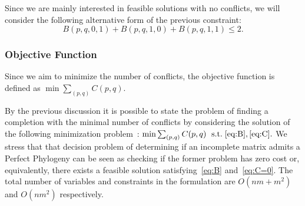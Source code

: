 \documentclass[a4paper,USenglish]{article}
\newcommand{\notaestesa}[2]{%
   \marginpar{\color{red!75!black}\textbf{\texttimes}}%
   {\color{red!75!black}%
     [\,\textbullet\,\textsf{\textbf{#1:}} %
     \textsf{\footnotesize#2}\,\textbullet\,]}%
 }
\theoremstyle{definition}
\begin{document}
Since we are mainly interested in feasible solutions with no conflicts,
we  will  consider  the   following  alternative  form  of  the  previous
constraint: 
\begin{equation}\label{eq:C=0}
   B(p,q,0,1) + B(p,q,1,0) + B(p,q,1,1)\le 2.  
\end{equation}


%
\subsubsection{Objective Function} Since we aim to minimize
the number of conflicts,  the objective function is defined as
$\min\sum_{(p,q)}C(p,q)$.

By the previous discussion it is possible to state the problem of
finding a  completion with the  minimal number  of conflicts by  considering the
solution of the following minimization problem~\cite{Gusfield2007}: 
$
\min\sum_{(p,q)}C(p,q)\;\text{ s.t.}\;\eqref{eq:B}, \eqref{eq:C}.
$
We stress that that decision problem of determining if an incomplete matrix admits a
Perfect Phylogeny can be seen as checking if the former problem has zero cost  or,
equivalently, there exists a  feasible  solution  satisfying~\eqref{eq:B}
and~\eqref{eq:C=0}.
The  total  number of  variables  and  constraints  in  the formulation  are
$O(nm+m^2)$ and $O(nm^2)$ respectively.
\end{document}
